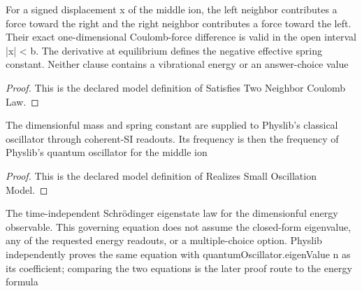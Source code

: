\begin{definition}
  \label{def:physics:phyx-mini-0658:phyxminiproblems-problemphyxmini0658-satisfiestwoneighborcoulomblaw}
  For a signed displacement x of the middle ion, the left neighbor contributes a force toward the right and the right neighbor contributes a force toward the left. Their exact one-dimensional Coulomb-force difference is valid in the open interval |x| < b. The derivative at equilibrium defines the negative effective spring constant. Neither clause contains a vibrational energy or an answer-choice value
\end{definition}
\begin{proof}
  This is the declared model definition of Satisfies Two Neighbor Coulomb Law.
\end{proof}
\begin{definition}
  \label{def:physics:phyx-mini-0658:phyxminiproblems-problemphyxmini0658-realizessmalloscillationmodel}
  The dimensionful mass and spring constant are supplied to Physlib's classical oscillator through coherent-SI readouts. Its frequency is then the frequency of Physlib's quantum oscillator for the middle ion
\end{definition}
\begin{proof}
  This is the declared model definition of Realizes Small Oscillation Model.
\end{proof}
\begin{definition}
  \label{def:physics:phyx-mini-0658:phyxminiproblems-problemphyxmini0658-satisfiesvibrationalschrodingerequation}
  The time-independent Schrödinger eigenstate law for the dimensionful energy observable. This governing equation does not assume the closed-form eigenvalue, any of the requested energy readouts, or a multiple-choice option. Physlib independently proves the same equation with quantumOscillator.eigenValue n as its coefficient; comparing the two equations is the later proof route to the energy formula
\end{definition}
